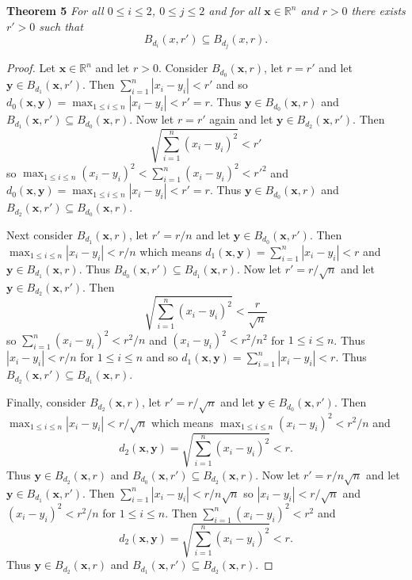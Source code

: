 \documentclass{article}
\begin{document}
\begin{flushleft}
\textbf{Theorem 5}
\textsl{For all $0 \leq i \leq 2$, $0 \leq j \leq 2$ and for all $\mathbf x \in \mathbb{R}^n$ and $r>0$ there exists $r'>0$ such that
\[
B_{d_i} (x, r') \subseteq B_{d_j} (x,r).
\]}
\begin{proof}
Let $\mathbf x \in \mathbb{R}^n$ and let $r>0$. Consider $B_{d_0}(\mathbf x, r)$, let $r = r'$ and let $\mathbf y \in B_{d_1}(\mathbf x, r')$. Then $\sum_{i=1}^n |x_i - y_i| < r'$ and so $d_0(\mathbf x, \mathbf y) = \max_{1 \leq i \leq n} |x_i - y_i| < r' = r$. Thus $\mathbf y \in B_{d_0}(\mathbf x, r)$ and $B_{d_1}(\mathbf x, r') \subseteq B_{d_0}(\mathbf x, r)$. Now let $r=r'$ again and let $\mathbf y \in B_{d_2}(\mathbf x, r')$. Then
\[
\sqrt{\sum_{i=1}^n (x_i - y_i)^2} < r'
\]
so $\max_{1 \leq i \leq n} (x_i - y_i)^2 < \sum_{i=1}^n (x_i - y_i)^2 < r'^2$ and $d_0(\mathbf x, \mathbf y) = \max_{1 \leq i \leq n} |x_i - y_i| < r' = r$. Thus $\mathbf y \in B_{d_0}(\mathbf x, r)$ and $B_{d_2}(\mathbf x, r') \subseteq B_{d_0}(\mathbf x, r)$.\newline

Next consider $B_{d_1}(\mathbf x, r)$, let $r' = r/n$ and let $\mathbf y \in B_{d_0}(\mathbf x, r')$. Then $\max_{1 \leq i \leq n} |x_i - y_i| < r/n$ which means $d_1(\mathbf x, \mathbf y) = \sum_{i=1}^n |x_i - y_i| < r$ and $\mathbf{y} \in B_{d_1}(\mathbf x, r)$. Thus $B_{d_0}(\mathbf x, r') \subseteq B_{d_1}(\mathbf x, r)$. Now let $r' = r/\sqrt{n}$ and let $\mathbf y \in B_{d_2}(\mathbf x, r')$. Then
\[
\sqrt{\sum_{i=1}^n (x_i - y_i)^2} < \frac{r}{\sqrt{n}}
\]
so $\sum_{i=1}^n (x_i - y_i)^2 < r^2/n$ and $(x_i - y_i)^2 < r^2/n^2$ for $1 \leq i \leq n$. Thus $|x_i - y_i| < r/n$ for $1 \leq i \leq n$ and so $d_1(\mathbf x, \mathbf y) = \sum_{i=1}^n |x_i - y_i| < r$. Thus $B_{d_2}(\mathbf x, r') \subseteq B_{d_1}(\mathbf x, r)$.\newline

Finally, consider $B_{d_2}(\mathbf x, r)$, let $r' = r/\sqrt{n}$ and let $\mathbf y \in B_{d_0}(\mathbf x, r')$. Then $\max_{1 \leq i \leq n} |x_i - y_i| < r/\sqrt{n}$ which means $\max_{1 \leq i \leq n} (x_i - y_i)^2 < r^2/n$ and
\[
d_2(\mathbf x, \mathbf y) = \sqrt{\sum_{i=1}^n (x_i-y_i)^2} < r.
\]
Thus $\mathbf y \in B_{d_2}(\mathbf x, r)$ and $B_{d_0}(\mathbf x, r') \subseteq B_{d_2}(\mathbf x, r)$. Now let $r' = r/n\sqrt{n}$ and let $\mathbf y \in B_{d_1}(\mathbf x, r')$. Then $\sum_{i=1}^n |x_i - y_i| < r/n\sqrt{n}$ so $|x_i - y_i| < r/\sqrt{n}$ and $(x_i - y_i)^2 < r^2/n$ for $1 \leq i \leq n$. Then $\sum_{i=1}^n (x_i - y_i)^2 < r^2$ and
\[
d_2(\mathbf x, \mathbf y) = \sqrt{\sum_{i=1}^n (x_i-y_i)^2} < r.
\]
Thus $\mathbf y \in B_{d_2}(\mathbf x, r)$ and $B_{d_1} (\mathbf x, r') \subseteq B_{d_2}(\mathbf x, r)$.
\end{proof}


\end{flushleft}
\end{document}
